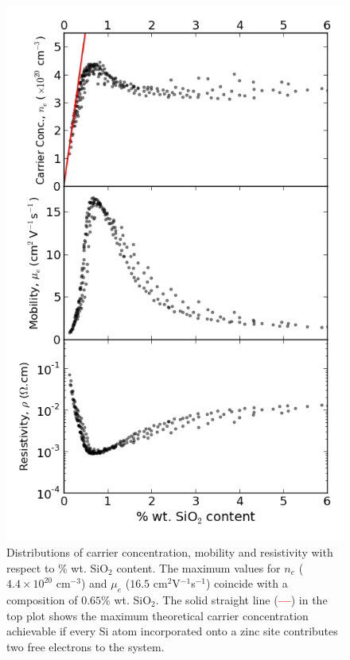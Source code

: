 \documentclass[preprint]{elsarticle}
\begin{document}
\begin{figure}[p]
\centering
\includegraphics[scale = 0.5]{figure_6.png}
\caption{\label{fig:6} Distributions of carrier concentration, mobility and resistivity with respect to \% wt. SiO$_{2}$ content. The maximum values for $n_e$ ($4.4\times10^{20}$ cm$^{-3}$) and $\mu_{e}$ ($16.5$ cm$^{2}$V$^{-1}$s$^{-1}$) coincide with a composition of $0.65$\% wt. SiO$_{2}$. The solid straight line (\textcolor{red}{\textbf{---}}) in the top plot shows the maximum theoretical carrier concentration achievable if every Si atom incorporated onto a zinc site contributes two free electrons to the system.}
\end{figure}
\end{document}
